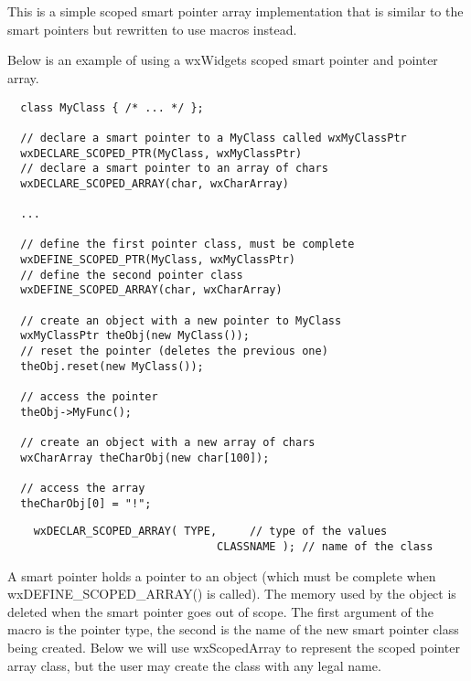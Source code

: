\section{}\label{wxscopedarray}

This is a simple scoped smart pointer array implementation that is similar to 
the  smart pointers but rewritten to
use macros instead.


Below is an example of using a wxWidgets scoped smart pointer and 
pointer array.

\begin{verbatim}
  class MyClass { /* ... */ };

  // declare a smart pointer to a MyClass called wxMyClassPtr
  wxDECLARE_SCOPED_PTR(MyClass, wxMyClassPtr)
  // declare a smart pointer to an array of chars
  wxDECLARE_SCOPED_ARRAY(char, wxCharArray)

  ...

  // define the first pointer class, must be complete
  wxDEFINE_SCOPED_PTR(MyClass, wxMyClassPtr)
  // define the second pointer class
  wxDEFINE_SCOPED_ARRAY(char, wxCharArray)

  // create an object with a new pointer to MyClass
  wxMyClassPtr theObj(new MyClass());
  // reset the pointer (deletes the previous one)
  theObj.reset(new MyClass());

  // access the pointer
  theObj->MyFunc();

  // create an object with a new array of chars
  wxCharArray theCharObj(new char[100]);

  // access the array
  theCharObj[0] = "!";
\end{verbatim}


\begin{verbatim}
    wxDECLAR_SCOPED_ARRAY( TYPE,     // type of the values
                                CLASSNAME ); // name of the class
\end{verbatim}

A smart pointer holds a pointer to an object (which must be complete
when wxDEFINE\_SCOPED\_ARRAY() is called). The memory used by the object is
deleted when the smart pointer goes out of scope. The first argument
of the macro is the pointer type, the second is the name of the new
smart pointer class being created.  Below we will use wxScopedArray to
represent the scoped pointer array class, but the user may create the class 
with any legal name.

